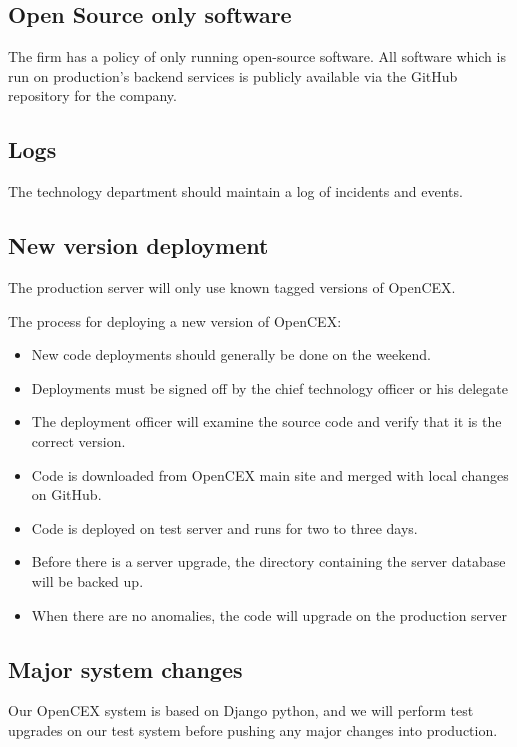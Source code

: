 \subsection{Open Source only software}

The firm has a policy of only running open-source software.  All
software which is run on production's backend services is publicly
available via the GitHub repository for the company.

\subsection{Logs}
The technology department should maintain a log of incidents and
events.

\subsection{New version deployment}
The production server will only use known tagged versions of OpenCEX.

The process for deploying a new version of OpenCEX:
\begin{itemize}
  \item New code deployments should generally be done on the weekend.
  \item Deployments must be signed off by the chief technology officer
    or his delegate
  \item The deployment officer will examine the source code and verify
    that it is the correct version.
  \item Code is downloaded from OpenCEX main site and merged with
    local changes on GitHub.
  \item Code is deployed on test server and runs for two to three days.
  \item Before there is a server upgrade, the directory containing the
    server database will be backed up.
  \item When there are no anomalies, the code will upgrade on the
    production server
\end{itemize}

\subsection{Major system changes}

Our OpenCEX system is based on Django python, and we will perform test
upgrades on our test system before pushing any major changes into
production.

